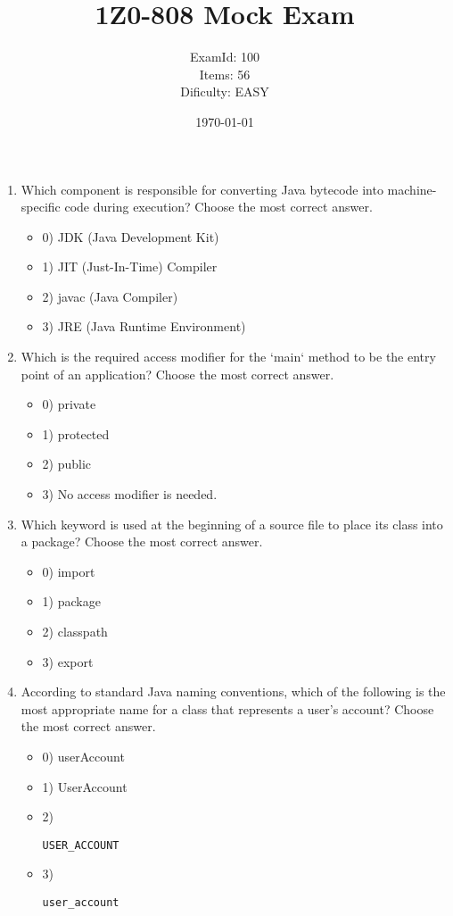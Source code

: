 \documentclass[12pt]{article}
\title{\textbf{1Z0-808 Mock Exam}}
\author{ExamId: 100 \\ Items: 56 \\ Dificulty: EASY}
\date{\today}
\begin{document}
\maketitle

\begin{enumerate}[label=(\arabic*)]
\item Which component is responsible for converting Java bytecode into machine-specific code during execution?
Choose the most correct answer. 
\begin{itemize}
\item 0) JDK (Java Development Kit)
\item 1) JIT (Just-In-Time) Compiler
\item 2) javac (Java Compiler)
\item 3) JRE (Java Runtime Environment)
\end{itemize}
\item Which is the required access modifier for the `main` method to be the entry point of an application?
Choose the most correct answer. 
\begin{itemize}
\item 0) private
\item 1) protected
\item 2) public
\item 3) No access modifier is needed.
\end{itemize}
\item Which keyword is used at the beginning of a source file to place its class into a package?
Choose the most correct answer. 
\begin{itemize}
\item 0) import
\item 1) package
\item 2) classpath
\item 3) export
\end{itemize}
\item According to standard Java naming conventions, which of the following is the most appropriate name for a class that represents a user's account?
Choose the most correct answer. 
\begin{itemize}
\item 0) userAccount
\item 1) UserAccount
\item 2) \begin{verbatim}USER_ACCOUNT\end{verbatim}
\item 3) \begin{verbatim}user_account\end{verbatim}

\end{itemize}
\end{enumerate}
\end{document}
